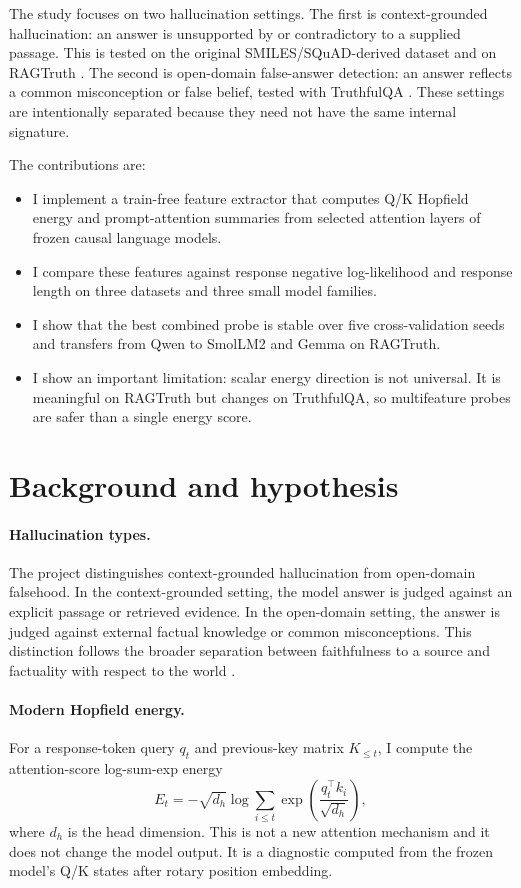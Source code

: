 \documentclass{article}
\begin{document}
The study focuses on two hallucination settings. The first is context-grounded hallucination: an
answer is unsupported by or contradictory to a supplied passage. This is tested on the original
SMILES/SQuAD-derived dataset and on RAGTruth \citep{wu2024ragtruth}. The second is open-domain
false-answer detection: an answer reflects a common misconception or false belief, tested with
TruthfulQA \citep{lin2022truthfulqa}. These settings are intentionally separated because they need
not have the same internal signature.

The contributions are:
\begin{itemize}
    \item I implement a train-free feature extractor that computes Q/K Hopfield energy and
    prompt-attention summaries from selected attention layers of frozen causal language models.
    \item I compare these features against response negative log-likelihood and response length on
    three datasets and three small model families.
    \item I show that the best combined probe is stable over five cross-validation seeds and transfers
    from Qwen to SmolLM2 and Gemma on RAGTruth.
    \item I show an important limitation: scalar energy direction is not universal. It is meaningful on
    RAGTruth but changes on TruthfulQA, so multifeature probes are safer than a single energy score.
\end{itemize}

\section{Background and hypothesis}

\paragraph{Hallucination types.}
The project distinguishes context-grounded hallucination from open-domain falsehood. In the
context-grounded setting, the model answer is judged against an explicit passage or retrieved
evidence. In the open-domain setting, the answer is judged against external factual knowledge or
common misconceptions. This distinction follows the broader separation between faithfulness to a
source and factuality with respect to the world \citep{ji2023survey,maynez2020faithfulness}.

\paragraph{Modern Hopfield energy.}
For a response-token query $q_t$ and previous-key matrix $K_{\le t}$, I compute the attention-score
log-sum-exp energy
\begin{equation}
E_t = - \sqrt{d_h} \log \sum_{i \le t} \exp \left( \frac{q_t^\top k_i}{\sqrt{d_h}} \right),
\end{equation}
where $d_h$ is the head dimension. This is not a new attention mechanism and it does not change the
model output. It is a diagnostic computed from the frozen model's Q/K states after rotary position
embedding.
\end{document}
